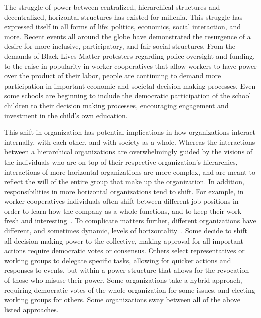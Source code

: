 The struggle of power between centralized, hierarchical structures and
decentralized, horizontal structures has existed for millenia. This struggle has
expressed itself in all forms of life: politics, economics, social interaction,
and more. Recent events all around the globe have demonstrated the resurgence of
a desire for more inclusive, participatory, and fair social structures. From the
demands of Black Lives Matter protesters regarding police oversight and funding,
to the raise in popularity in worker cooperatives that allow workers to have
power over the product of their labor, people are continuing to demand more
participation in important economic and societal decision-making processes. %
Even some schools are beginning to include the democratic participation of the
school children to their decision making processes, encouraging engagement and
investment in the child's own education.~\cite{pacheco2008escola}

This shift in organization has potential implications in how organizations
interact internally, with each other, and with society as a whole. Whereas the
interactions between a hierarchical organizations are overwhelmingly guided by
the visions of the individuals who are on top of their respective organization's
hierarchies, interactions of more horizontal organizations are more complex, and
are meant to reflect the will of the entire group that make up the organization.
In addition, responsibilities in more horizontal organizations tend to shift.
For example, in worker cooperatives individuals often shift between different
job positions in order to learn how the company as a whole functions, and to
keep their work fresh and 
interesting~\cite{jackall19846, wright2014worker, lindenfeld1982workplace}.
To complicate matters further, different organizations have different, and
sometimes dynamic, levels of  horizontality~\cite{wright2014worker}. Some decide
to shift all decision making power to the collective, making approval for all
important actions require democratic votes or consensus. Others select
representatives or working groups to delegate specific tasks, allowing for
quicker actions and responses to events, but within a power structure that
allows for the revocation of those who misuse their power. Some organizations
take a hybrid approach, requiring democratic votes of the whole organization for
some issues, and electing working groups for others. Some organizations sway
between all of the above listed approaches.

